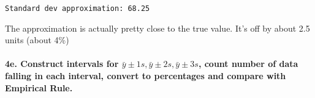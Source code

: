 \documentclass{article}
\begin{document}
    \begin{Verbatim}[commandchars=\\\{\}]
Standard dev approximation: 68.25
    \end{Verbatim}

    The approximation is actually pretty close to the true value. It's off
by about 2.5 units (about 4\%)

    \paragraph{4e. Construct intervals for
$\bar{y} \pm 1s, \bar{y} \pm 2s, \bar{y} \pm 3s$, count number of data
falling in each interval, convert to percentages and compare with
Empirical
Rule.}\label{e.-construct-intervals-for-bary-pm-1s-bary-pm-2s-bary-pm-3s-count-number-of-data-falling-in-each-interval-convert-to-percentages-and-compare-with-empirical-rule.}
\end{document}
